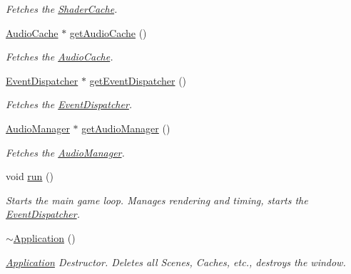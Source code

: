 \begin{DoxyCompactItemize}
\begin{DoxyCompactList}\small\item\em Fetches the \mbox{\hyperlink{classsage_1_1ShaderCache}{Shader\+Cache}}. \end{DoxyCompactList}\item 
\mbox{\hyperlink{classsage_1_1AudioCache}{Audio\+Cache}} $\ast$ \mbox{\hyperlink{classsage_1_1Application_aaed4c540666d784b83d5506e51fb5eaa}{get\+Audio\+Cache}} ()
\begin{DoxyCompactList}\small\item\em Fetches the \mbox{\hyperlink{classsage_1_1AudioCache}{Audio\+Cache}}. \end{DoxyCompactList}\item 
\mbox{\hyperlink{classsage_1_1EventDispatcher}{Event\+Dispatcher}} $\ast$ \mbox{\hyperlink{classsage_1_1Application_a37c65bddaa8e4534b28f5b36b66fdd81}{get\+Event\+Dispatcher}} ()
\begin{DoxyCompactList}\small\item\em Fetches the \mbox{\hyperlink{classsage_1_1EventDispatcher}{Event\+Dispatcher}}. \end{DoxyCompactList}\item 
\mbox{\hyperlink{classsage_1_1AudioManager}{Audio\+Manager}} $\ast$ \mbox{\hyperlink{classsage_1_1Application_ac21f1df422a3589af890dc7616b272d7}{get\+Audio\+Manager}} ()
\begin{DoxyCompactList}\small\item\em Fetches the \mbox{\hyperlink{classsage_1_1AudioManager}{Audio\+Manager}}. \end{DoxyCompactList}\item 
void \mbox{\hyperlink{classsage_1_1Application_a68965449404743bf1add056784d6cf81}{run}} ()
\begin{DoxyCompactList}\small\item\em Starts the main game loop. Manages rendering and timing, starts the \mbox{\hyperlink{classsage_1_1EventDispatcher}{Event\+Dispatcher}}. \end{DoxyCompactList}\item 
\mbox{\hyperlink{classsage_1_1Application_a748bca84fefb9c12661cfaa2f623748d}{$\sim$\+Application}} ()
\begin{DoxyCompactList}\small\item\em \mbox{\hyperlink{classsage_1_1Application}{Application}} Destructor. Deletes all Scenes, Caches, etc., destroys the window. \end{DoxyCompactList}\end{DoxyCompactItemize}
